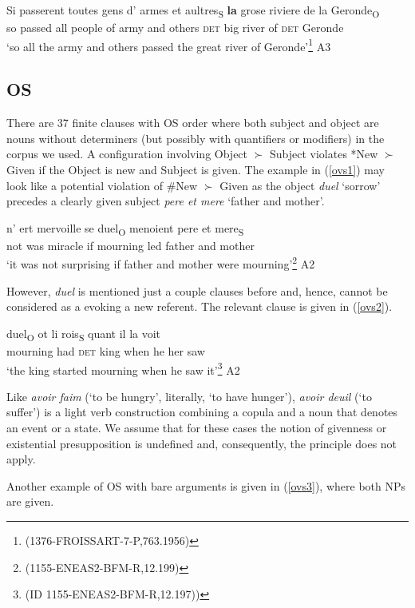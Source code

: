 \documentclass[output=paper,modfonts,nonflat]{langsci/langscibook}
\begin{document}
\ea
\gll Si passerent toutes gens d' armes et aultres\textsubscript{S} {\bfseries la} grose riviere de la Geronde\textsubscript{O}\\
so passed all people of army and others {\scshape det} big river of {\scshape det} Geronde\\
\glt  `so all the army and others passed the great river of Geronde'\footnote{{(1376-FROISSART-7-P,763.1956)}}\label{vso2} \hfill A3
\z

\subsection{OS}

There are 37 finite clauses with OS order where both subject and object are nouns without determiners (but possibly with quantifiers or modifiers) in the corpus we used. A configuration involving Object $\succ$ Subject violates *New $\succ$ Given if the Object is new and Subject is given. The example in (\ref{ovs1}) may look like a potential violation of \#New $\succ$ Given as the object {\itshape duel}  `sorrow' precedes a clearly given subject {\itshape pere et mere}  `father and mother'.

\ea
\gll n' ert mervoille se duel\textsubscript{O} menoient pere et mere\textsubscript{S}\\
not was miracle if mourning led father and mother\\
\glt  `it was not surprising if father and mother were mourning'\footnote{{(1155-ENEAS2-BFM-R,12.199)}}\label{ovs1} \hfill A2
\z

However, {\itshape duel} is mentioned just a couple clauses before and, hence, cannot be considered as a evoking a new referent. The relevant clause is given in (\ref{ovs2}).

\ea
\gll duel\textsubscript{O} ot li rois\textsubscript{S} quant il la voit\\
mourning had {\scshape det} king when he her saw\\
\glt  `the king started mourning when he saw it'\footnote{{(ID 1155-ENEAS2-BFM-R,12.197))}} \hfill A2
\z

Like {\itshape avoir faim} (`to be hungry', literally,  `to have hunger'), {\itshape avoir deuil} (`to suffer') is a light verb construction combining a copula and a noun that denotes an event or a state. We assume that for these cases the notion of givenness or existential presupposition is undefined and, consequently, the principle does not apply.

Another example of OS with bare arguments is given in (\ref{ovs3}), where both NPs are given.
\end{document}
